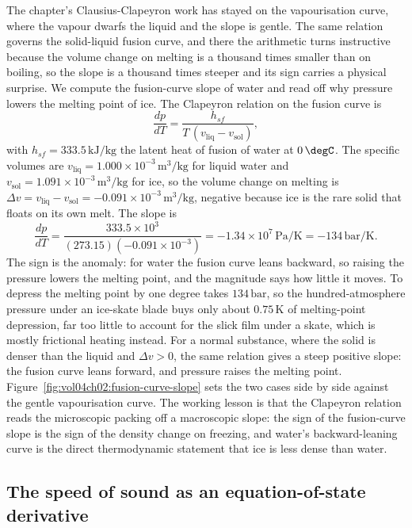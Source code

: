 The chapter's Clausius-Clapeyron work has stayed on the vapourisation curve,
where the vapour dwarfs the liquid and the slope is gentle. The same
relation governs the solid-liquid fusion curve, and there the arithmetic
turns instructive because the volume change on melting is a thousand times
smaller than on boiling, so the slope is a thousand times steeper and its
sign carries a physical surprise. We compute the fusion-curve slope of water
and read off why pressure lowers the melting point of ice. The Clapeyron
relation on the fusion curve is
\[
\frac{dp}{dT} = \frac{h_{sf}}{T\,(v_{\text{liq}} - v_{\text{sol}})},
\]
with $h_{sf} = 333.5\,\text{kJ}/\text{kg}$ the latent heat of fusion of
water at $0\,\degC$. The specific volumes are $v_{\text{liq}} = 1.000\times
10^{-3}\,\text{m}^3/\text{kg}$ for liquid water and $v_{\text{sol}} =
1.091\times 10^{-3}\,\text{m}^3/\text{kg}$ for ice, so the volume change on
melting is $\Delta v = v_{\text{liq}} - v_{\text{sol}} = -0.091\times
10^{-3}\,\text{m}^3/\text{kg}$, negative because ice is the rare solid that
floats on its own melt. The slope is
\[
\frac{dp}{dT} = \frac{333.5\times 10^3}{(273.15)(-0.091\times 10^{-3})} =
-1.34\times 10^7\,\text{Pa}/\si{\kelvin} = -134\,\text{bar}/\si{\kelvin}.
\]
The sign is the anomaly: for water the fusion curve leans backward,
so raising the pressure lowers the melting point, and the magnitude says how
little it moves. To depress the melting point by one degree takes
$134\,\text{bar}$, so the hundred-atmosphere pressure under an ice-skate
blade buys only about $0.75\,\si{\kelvin}$ of melting-point depression, far
too little to account for the slick film under a skate, which is mostly
frictional heating instead. For a normal substance, where the solid is
denser than the liquid and $\Delta v > 0$, the same relation gives a steep
positive slope: the fusion curve leans forward, and pressure raises the
melting point. Figure~\ref{fig:vol04ch02:fusion-curve-slope} sets the two
cases side by side against the gentle vapourisation curve. The working
lesson is that the Clapeyron relation reads the microscopic packing off a
macroscopic slope: the sign of the fusion-curve slope is the sign of the
density change on freezing, and water's backward-leaning curve is the direct
thermodynamic statement that ice is less dense than water.



\subsection{The speed of sound as an equation-of-state derivative}


